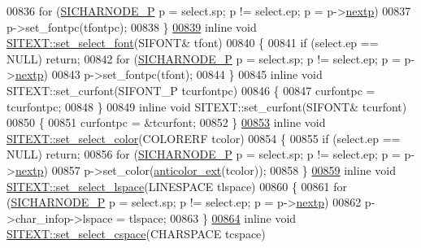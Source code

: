\begin{DoxyCode}
00836     \textcolor{keywordflow}{for} (\hyperlink{class_s_i_c_h_a_r_n_o_d_e}{SICHARNODE\_P} p = select.sp; p != select.ep; p = p->\hyperlink{class_s_i_c_h_a_r_n_o_d_e_ab188ae5c7731bcc66a1042defcf158c8}{nextp})
00837         p->set\_fontpc(tfontpc);
00838 \}
\hyperlink{class_s_i_t_e_x_t_a2b1208eb0796a08112449e7273b271df}{00839} \textcolor{keyword}{inline} \textcolor{keywordtype}{void} \hyperlink{class_s_i_t_e_x_t_a4e33142038f2ba1d42660dec1134d2f9}{SITEXT::set\_select\_font}(SIFONT& tfont)
00840 \{
00841     \textcolor{keywordflow}{if} (select.ep == NULL) \textcolor{keywordflow}{return};
00842     \textcolor{keywordflow}{for} (\hyperlink{class_s_i_c_h_a_r_n_o_d_e}{SICHARNODE\_P} p = select.sp; p != select.ep; p = p->\hyperlink{class_s_i_c_h_a_r_n_o_d_e_ab188ae5c7731bcc66a1042defcf158c8}{nextp})
00843         p->set\_fontpc(tfont);
00844 \}
00845 \textcolor{keyword}{inline} \textcolor{keywordtype}{void} SITEXT::set\_curfont(SIFONT\_P tcurfontpc)
00846 \{
00847     curfontpc = tcurfontpc;
00848 \}
00849 \textcolor{keyword}{inline} \textcolor{keywordtype}{void} SITEXT::set\_curfont(SIFONT& tcurfont)
00850 \{
00851     curfontpc = &tcurfont;
00852 \}
\hyperlink{class_s_i_t_e_x_t_abfd80c912a40b72c0cb113ad147b3d33}{00853} \textcolor{keyword}{inline} \textcolor{keywordtype}{void} \hyperlink{class_s_i_t_e_x_t_abfd80c912a40b72c0cb113ad147b3d33}{SITEXT::set\_select\_color}(COLORERF tcolor)
00854 \{
00855     \textcolor{keywordflow}{if} (select.ep == NULL) \textcolor{keywordflow}{return};
00856     \textcolor{keywordflow}{for} (\hyperlink{class_s_i_c_h_a_r_n_o_d_e}{SICHARNODE\_P} p = select.sp; p != select.ep; p = p->\hyperlink{class_s_i_c_h_a_r_n_o_d_e_ab188ae5c7731bcc66a1042defcf158c8}{nextp})
00857         p->set\_color(\hyperlink{kernal_8h_abd07a7735390aea7bf376c2bcc75bd96}{anticolor\_ext}(tcolor));
00858 \}
\hyperlink{class_s_i_t_e_x_t_af79cfc54434033545610de0dc0580fa9}{00859} \textcolor{keyword}{inline} \textcolor{keywordtype}{void} \hyperlink{class_s_i_t_e_x_t_af79cfc54434033545610de0dc0580fa9}{SITEXT::set\_select\_lspace}(LINESPACE tlspace)
00860 \{
00861     \textcolor{keywordflow}{for} (\hyperlink{class_s_i_c_h_a_r_n_o_d_e}{SICHARNODE\_P} p = select.sp; p != select.ep; p = p->\hyperlink{class_s_i_c_h_a_r_n_o_d_e_ab188ae5c7731bcc66a1042defcf158c8}{nextp})
00862         p->char\_infop->lspace = tlspace;
00863 \}
\hyperlink{class_s_i_t_e_x_t_a4fde9667222b3289a6c98da2871661af}{00864} \textcolor{keyword}{inline} \textcolor{keywordtype}{void} \hyperlink{class_s_i_t_e_x_t_a4fde9667222b3289a6c98da2871661af}{SITEXT::set\_select\_cspace}(CHARSPACE tcspace)

\end{DoxyCode}
